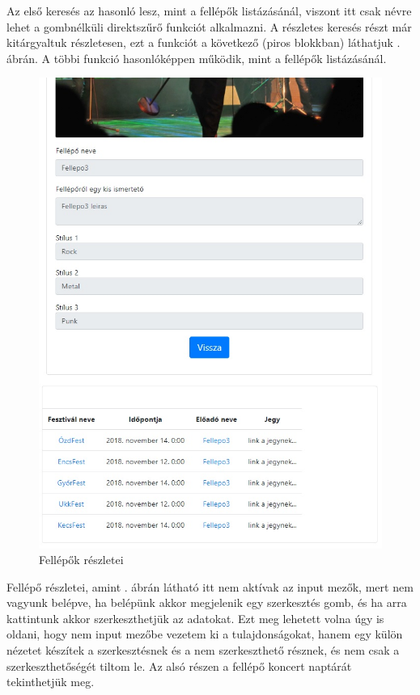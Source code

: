 Az első keresés az hasonló lesz, mint a fellépők listázásánál, viszont itt csak névre lehet a gombnélküli direktszűrő funkciót alkalmazni. A részletes keresés részt már kitárgyaltuk részletesen, ezt a funkciót a következő (piros blokkban) láthatjuk . ábrán. A többi funkció hasonlóképpen működik, mint a fellépők listázásánál.

\begin{figure}[h!]
\centering
\includegraphics[scale=0.8]{kepek/artistDet.jpg}
\caption{Fellépők részletei}
\label{fig:artistDet}
\end{figure}

Fellépő részletei, amint . ábrán látható itt nem aktívak az input mezők, mert nem vagyunk belépve, ha belépünk akkor megjelenik egy szerkesztés gomb, és ha arra kattintunk akkor szerkeszthetjük az adatokat. Ezt meg lehetett volna úgy is oldani, hogy nem input mezőbe vezetem ki a tulajdonságokat, hanem egy külön nézetet készítek a szerkesztésnek és a nem szerkeszthető résznek, és nem csak a szerkeszthetőségét tiltom le. Az alsó részen a fellépő koncert naptárát tekinthetjük meg.


